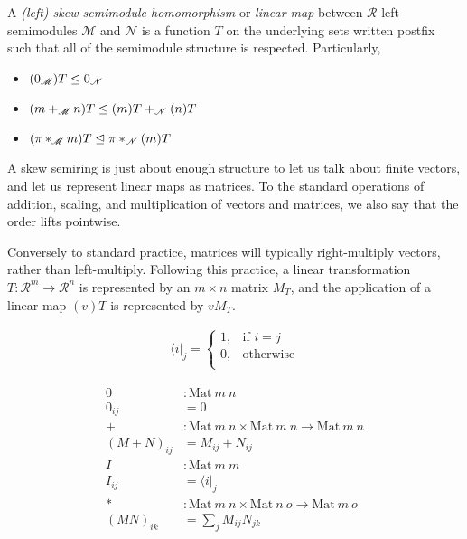 \documentclass[submission,copyright,creativecommons]{eptcs}
\begin{document}
\begin{definition}
  A \emph{(left) skew semimodule homomorphism} or \emph{linear map} between
  $\mathscr R$-left semimodules $\mathscr M$ and $\mathscr N$ is a function $T$
  on the underlying sets written postfix such that all of the semimodule
  structure is respected.
  Particularly,
  \begin{itemize}
  \item $(0_\mathscr M)T \trianglelefteq 0_\mathscr N$
  \item $(m +_\mathscr M n)T \trianglelefteq (m)T +_\mathscr N (n)T$
  \item $(\pi *_\mathscr M m)T \trianglelefteq \pi *_\mathscr N (m)T$
  \end{itemize}
\end{definition}

A skew semiring is just about enough structure to let us talk about finite
vectors, and let us represent linear maps as matrices.
To the standard operations of addition, scaling, and multiplication of vectors
and matrices, we also say that the order lifts pointwise.

Conversely to standard practice, matrices will typically right-multiply vectors,
rather than left-multiply.
Following this practice, a linear transformation
$T : \mathscr R^m \to \mathscr R^n$ is represented by an $m \times n$ matrix
$M_T$, and the application of a linear map $(v)T$ is represented by $vM_T$.

\begin{definition}
  \begin{align*}
    \langle i \rvert_j =
    \begin{cases}
      1, & \textrm{if }i = j \\
      0, & \textrm{otherwise} \\
    \end{cases}
  \end{align*}
\end{definition}

\begin{definition}
    \begin{align*}
      0 &: \mathrm{Mat}~m~n \\
      0_{ij} &= 0 \\
      + &: \mathrm{Mat}~m~n \times \mathrm{Mat}~m~n \to \mathrm{Mat}~m~n \\
      (M + N)_{ij} &= M_{ij} + N_{ij} \\
      I &: \mathrm{Mat}~m~m \\
      I_{ij} &= \langle i \rvert_j \\
      * &: \mathrm{Mat}~m~n \times \mathrm{Mat}~n~o \to \mathrm{Mat}~m~o \\
      (MN)_{ik} &= \sum_j M_{ij}N_{jk}
    \end{align*}
\end{definition}
\end{document}
